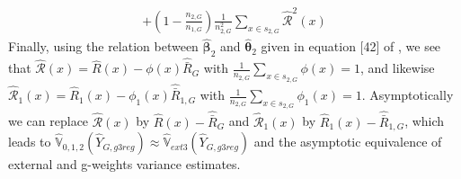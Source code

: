 \documentclass[a4paper,12pt,leqno, titlepage]{article}
\newcommand{\VAR}{\mathbb{V}}
\begin{document}
\begin{appendix}
\begin{eqnarray}
+(1-\frac{n_{2,G}}{n_{1,G}})\frac{1}{n_{2,G}^2}\sum_{x\in{s_{2,G}}}\hat{\mathcal{R}}^2(x)
\end{eqnarray}
\noindent Finally, using the relation between $\hat{\pmb{\beta}}_2$ and $\hat{\pmb{\theta}}_2$ given in equation [42]
of \cite{mandallazreport1}, we see that $\hat{\mathcal{R}}(x)=\hat{R}(x)-\phi(x)\hat{\bar{R}}_G$ with $\frac{1}{n_{2,G}}\sum_{x\in{s_{2,G}}}\phi(x)=1$, and likewise $\hat{\mathcal{R}}_1(x)=\hat{R}_1(x)-\phi_1(x)\hat{\bar{R}}_{1,G}$ with $\frac{1}{n_{2,G}}\sum_{x\in{s_{2,G}}}\phi_1(x)=1$. Asymptotically we can replace $\hat{\mathcal{R}}(x)$ by
$\hat{R}(x)-\hat{\bar{R}}_G$ and $\hat{\mathcal{R}}_1(x)$ by
$\hat{R}_1(x)-\hat{\bar{R}}_{1,G}$, which leads to
$\hat{\VAR}_{0,1,2}(\hat{Y}_{G,g3reg})\approx \hat{\VAR}_{ext3}(\hat{Y}_{G,g3reg})$ and the asymptotic equivalence
of external and g-weights variance estimates.

\end{appendix}
\end{document}
